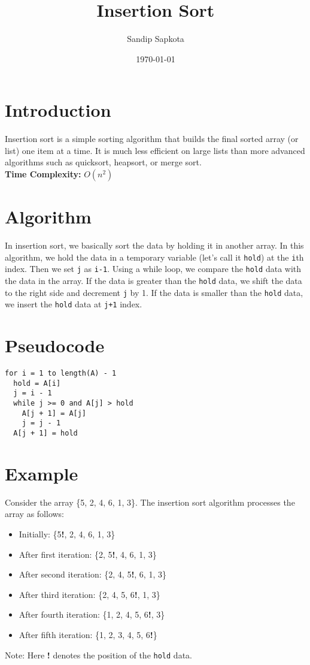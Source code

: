 \documentclass{article}
\title{Insertion Sort}
\author{Sandip Sapkota}
\date{\today}
\begin{document}
\maketitle

\section*{Introduction}

Insertion sort is a simple sorting algorithm that builds the final sorted array (or list) one item at a time. It is much less efficient on large lists than more advanced algorithms such as quicksort, heapsort, or merge sort.\\

\textbf{ Time Complexity:} $O(n^2)$
\section*{Algorithm}

In insertion sort, we basically sort the data by holding it in another array. In this algorithm, we hold the data in a temporary variable (let's call it \texttt{hold}) at the \texttt{i}th index. Then we set \texttt{j} as \texttt{i-1}. Using a while loop, we compare the \texttt{hold} data with the data in the array. If the data is greater than the \texttt{hold} data, we shift the data to the right side and decrement \texttt{j} by 1. If the data is smaller than the \texttt{hold} data, we insert the \texttt{hold} data at \texttt{j+1} index.

\section*{Pseudocode}

\begin{verbatim}
for i = 1 to length(A) - 1
  hold = A[i]
  j = i - 1
  while j >= 0 and A[j] > hold
    A[j + 1] = A[j]
    j = j - 1
  A[j + 1] = hold
  \end{verbatim}

\section*{Example}
Consider the array \{5, 2, 4, 6, 1, 3\}. The insertion sort algorithm processes the array as follows:

\begin{itemize}
  \item Initially: \{5\textbf{!}, 2, 4, 6, 1, 3\}
  \item After first iteration: \{2, 5\textbf{!}, 4, 6, 1, 3\}
  \item After second iteration: \{2, 4, 5\textbf{!}, 6, 1, 3\}
  \item After third iteration: \{2, 4, 5, 6\textbf{!}, 1, 3\}
  \item After fourth iteration: \{1, 2, 4, 5, 6\textbf{!}, 3\}
  \item After fifth iteration: \{1, 2, 3, 4, 5, 6\textbf{!}\}
\end{itemize}
Note: Here \textbf{!} denotes the position of the \texttt{hold} data.
\end{document}
